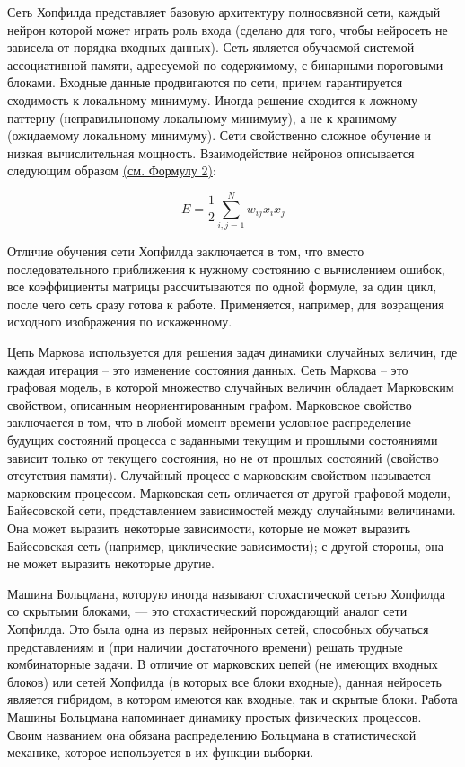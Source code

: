     Сеть Хопфилда представляет базовую архитектуру полносвязной сети, каждый нейрон которой может играть роль входа (сделано для того, чтобы нейросеть не зависела от порядка входных данных). Сеть является обучаемой системой ассоциативной памяти, адресуемой по содержимому, с бинарными пороговыми блоками. Входные данные продвигаются по сети, причем гарантируется сходимость к локальному минимуму. Иногда решение сходится к ложному паттерну (неправильноному локальному минимуму), а не к хранимому (ожидаемому локальному минимуму). Сети свойственно сложное обучение и низкая вычислительная мощность. Взаимодействие нейронов описывается следующим образом \hyperref[eq:eq2]{(см. Формулу 2)}:

    \begin{equation}
        E=\frac{1}{2} \sum_{i, j=1}^N w_{i j} x_i x_j
        \label{eq:eq2}
    \end{equation}

    Отличие обучения сети Хопфилда заключается в том, что вместо последовательного приближения к нужному состоянию с вычислением ошибок, все коэффициенты матрицы рассчитываются по одной формуле, за один цикл, после чего сеть сразу готова к работе. Применяется, например, для возращения исходного изображения по искаженному. 

    Цепь Маркова используется для решения задач динамики случайных величин, где каждая итерация – это изменение состояния данных. Сеть Маркова – это графовая модель, в которой множество случайных величин обладает Марковским свойством, описанным неориентированным графом. Марковское свойство заключается в том, что в любой момент времени условное распределение будущих состояний процесса с заданными текущим и прошлыми состояниями зависит только от текущего состояния, но не от прошлых состояний (свойство отсутствия памяти). Случайный процесс с марковским свойством называется марковским процессом. Марковская сеть отличается от другой графовой модели, Байесовской сети, представлением зависимостей между случайными величинами. Она может выразить некоторые зависимости, которые не может выразить Байесовская сеть (например, циклические зависимости); с другой стороны, она не может выразить некоторые другие.
    
    Машина Больцмана, которую иногда называют стохастической сетью Хопфилда со скрытыми блоками, — это стохастический порождающий аналог сети Хопфилда. Это была одна из первых нейронных сетей, способных обучаться представлениям и (при наличии достаточного времени) решать трудные комбинаторные задачи. В отличие от марковских цепей (не имеющих входных блоков) или сетей Хопфилда (в которых все блоки входные), данная нейросеть является гибридом, в котором имеются как входные, так и скрытые блоки. Работа Машины Больцмана напоминает динамику простых физических процессов. Своим названием она обязана распределению Больцмана в статистической механике, которое используется в их функции выборки.
    
